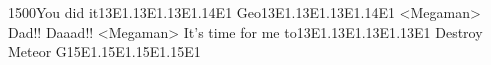 {15}{00}You did it{13}{E1}.{13}{E1}.{13}{E1}.{14}{E1} Geo{13}{E1}.{13}{E1}.{13}{E1}.{14}{E1} 
<Megaman> Dad!! 
Daaad!! 
<Megaman> It's time for me to{13}{E1}.{13}{E1}.{13}{E1}.{13}{E1} 
Destroy Meteor G{15}{E1}.{15}{E1}.{15}{E1}.{15}{E1} 
